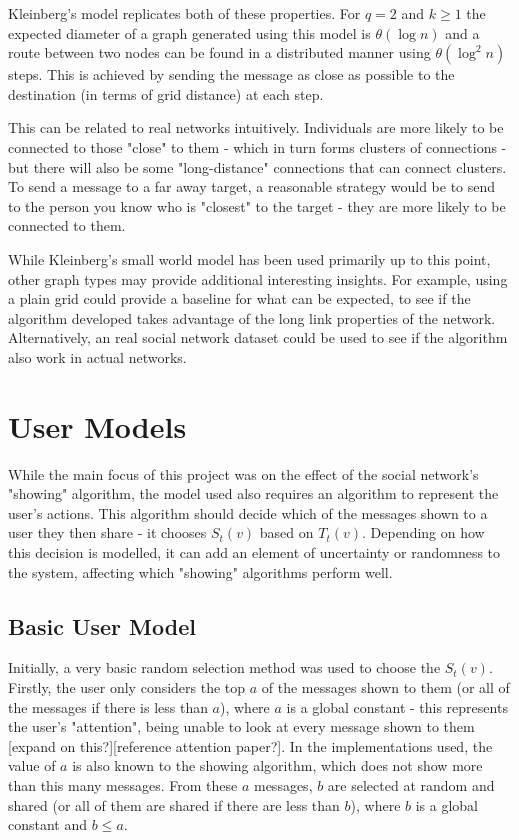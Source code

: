 \documentclass[bsc,frontabs,twoside,singlespacing,parskip,deptreport]{infthesis}     %
\begin{document}
Kleinberg's model replicates both of these properties. For $q = 2$ and $k \ge 1$ the expected diameter of a graph generated using this model is $\theta (\log n)$ and a route between two nodes can be found in a distributed manner using $\theta (\log^{2}n)$ steps\cite{AnalyzingKleinberg}. This is achieved by sending the message as close as possible to the destination (in terms of grid distance) at each step.

This can be related to real networks intuitively. Individuals are more likely to be connected to those "close" to them - which in turn forms clusters of connections - but there will also be some "long-distance" connections that can connect clusters. To send a message to a far away target, a reasonable strategy would be to send to the person you know who is "closest" to the target - they are more likely to be connected to them.

While Kleinberg's small world model has been used primarily up to this point, other graph types may provide additional interesting insights. For example, using a plain grid could provide a baseline for what can be expected, to see if the algorithm developed takes advantage of the long link properties of the network. Alternatively, an real social network dataset could be used to see if the algorithm also work in actual networks.

\section{User Models}
While the main focus of this project was on the effect of the social network's "showing" algorithm, the model used also requires an algorithm to represent the user's actions. This algorithm should decide which of the messages shown to a user they then share - it chooses $S_{t}(v)$ based on $T_{t}(v)$. Depending on how this decision is modelled, it can add an element of uncertainty or randomness to the system, affecting which "showing" algorithms perform well.

\subsection{Basic User Model}
Initially, a very basic random selection method was used to choose the $S_{t}(v)$. Firstly, the user only considers the top $a$ of the messages shown to them (or all of the messages if there is less than $a$), where $a$ is a global constant - this represents the user's "attention", being unable to look at every message shown to them [expand on this?][reference attention paper?]. In the implementations used, the value of $a$ is also known to the showing algorithm, which does not show more than this many messages. From these $a$ messages, $b$ are selected at random and shared (or all of them are shared if there are less than $b$), where $b$ is a global constant and $b \le a$.
\end{document}
